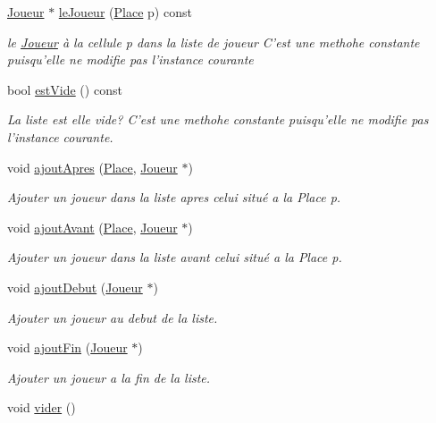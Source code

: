 \begin{DoxyCompactItemize}
\item 
\hyperlink{class_joueur}{\-Joueur} $\ast$ \hyperlink{class_liste_afde1a3e46b836ef3dfe680ae7061a6be}{le\-Joueur} (\hyperlink{class_cell}{\-Place} p) const 
\begin{DoxyCompactList}\small\item\em le \hyperlink{class_joueur}{\-Joueur} à la cellule p dans la liste de joueur \-C'est une methohe constante puisqu'elle ne modifie pas l'instance courante \end{DoxyCompactList}\item 
bool \hyperlink{class_liste_a4c801d79d83bbdea909cfbee51ca9570}{est\-Vide} () const 
\begin{DoxyCompactList}\small\item\em \-La liste est elle vide? \-C'est une methohe constante puisqu'elle ne modifie pas l'instance courante. \end{DoxyCompactList}\item 
void \hyperlink{class_liste_ac9f2fbeeaeb6d31e204900db31fde885}{ajout\-Apres} (\hyperlink{class_cell}{\-Place}, \hyperlink{class_joueur}{\-Joueur} $\ast$)
\begin{DoxyCompactList}\small\item\em \-Ajouter un joueur dans la liste apres celui situé a la \-Place p. \end{DoxyCompactList}\item 
void \hyperlink{class_liste_a69e508b2b13d64019012b946344ab1ce}{ajout\-Avant} (\hyperlink{class_cell}{\-Place}, \hyperlink{class_joueur}{\-Joueur} $\ast$)
\begin{DoxyCompactList}\small\item\em \-Ajouter un joueur dans la liste avant celui situé a la \-Place p. \end{DoxyCompactList}\item 
void \hyperlink{class_liste_ad46abffda844eef6d07cb5aa16e472b8}{ajout\-Debut} (\hyperlink{class_joueur}{\-Joueur} $\ast$)
\begin{DoxyCompactList}\small\item\em \-Ajouter un joueur au debut de la liste. \end{DoxyCompactList}\item 
void \hyperlink{class_liste_a1371f5d75a794a090d9fcbbb478d75f6}{ajout\-Fin} (\hyperlink{class_joueur}{\-Joueur} $\ast$)
\begin{DoxyCompactList}\small\item\em \-Ajouter un joueur a la fin de la liste. \end{DoxyCompactList}\item 
\hypertarget{class_liste_a770d5a6f4932ded0e2b51872116c8f78}{void \hyperlink{class_liste_a770d5a6f4932ded0e2b51872116c8f78}{vider} ()}\label{class_liste_a770d5a6f4932ded0e2b51872116c8f78}


\end{DoxyCompactItemize}
